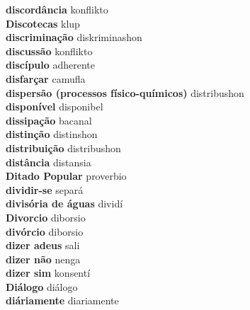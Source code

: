 \textbf{ discordância  } konflikto \\
\textbf{ Discotecas  } klup \\
\textbf{ discriminação  } diskriminashon \\
\textbf{ discussão  } konflikto \\
\textbf{ discípulo  } adherente \\
\textbf{ disfarçar  } camufla \\
\textbf{ dispersão (processos físico-químicos)  } distribushon \\
\textbf{ disponível  } disponibel \\
\textbf{ dissipação  } bacanal \\
\textbf{ distinção  } distinshon \\
\textbf{ distribuição  } distribushon \\
\textbf{ distância  } distansia \\
\textbf{ Ditado Popular  } proverbio \\
\textbf{ dividir-se  } separá \\
\textbf{ divisória de águas  } dividí \\
\textbf{ Divorcio  } diborsio \\
\textbf{ divórcio  } diborsio \\
\textbf{ dizer adeus  } sali \\
\textbf{ dizer não  } nenga \\
\textbf{ dizer sim  } konsentí \\
\textbf{ Diálogo  } diálogo \\
\textbf{ diáriamente  } diariamente \\
